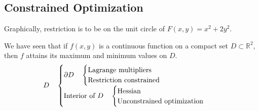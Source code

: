 \documentclass[11pt]{article}
\begin{document}
\subsection{Constrained Optimization}
Graphically, restriction is to be on the unit circle of $F(x,y) = x^2 + 2y^2$.

We have seen that if $f(x,y)$ is a continuous function on a compact set $D \subset \mathbb{R}^2$, then $f$ attains its maximum and minimum values on $D$.
\[
D \quad \begin{cases}
    \partial D \quad \begin{cases}
        \text{Lagrange multipliers} \\
        \text{Restriction constrained} \\
    \end{cases} \\
    \text{Interior of } D \quad \begin{cases}
        \text{Hessian} \\
        \text{Unconstrained optimization} \\
    \end{cases} \\
\end{cases} \\
\]
\end{document}
